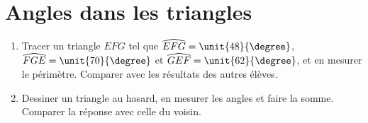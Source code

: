 

\section*{Angles dans les triangles}

\begin{enumerate}
    \item
    Tracer un triangle $EFG$ tel que $\widehat{EFG}=\unit{48}{\degree}$, \( \widehat{FGE}=\unit{70}{\degree}\) et \( \widehat{GEF}=\unit{62}{\degree}\), et en mesurer le périmètre. Comparer avec les résultats des autres élèves.
\item
    Dessiner un triangle au hasard, en mesurer les angles et faire la somme. Comparer la réponse avec celle du voisin.
\end{enumerate}
